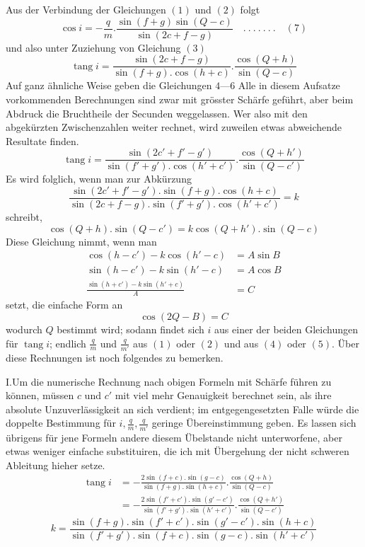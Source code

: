 Aus der Verbindung der Gleichungen $(1)$ und $(2)$ folgt
\[
\cos i=-\frac{q}{m}.\frac{\sin(f+g)\sin(Q-c)}{\sin(2c+f-g)}\quad.\ .\ .\ .\ .\ .\ .\quad(7)
\]
und also unter Zuziehung von Gleichung $(3)$
\[
\operatorname{tang}i=\frac{\sin(2c+f-g)}{\sin(f+g).\cos(h+c)}.\frac{\cos(Q+h)}{\sin(Q-c)}
\]
Auf ganz ähnliche Weise geben die Gleichungen $4$---$6$
\expandafter\def\csname HistoricalNoteText473\endcsname{Alle in diesem Aufsatze vorkommenden Berechnungen sind zwar mit grösster Schärfe geführt, aber beim Abdruck die Bruchtheile der Secunden weggelassen. Wer also mit den abgekürzten Zwischenzahlen weiter rechnet, wird zuweilen etwas abweichende Resultate finden.}
\[
\operatorname{tang}i=\frac{\sin(2c'+f'-g')}{\sin(f'+g').\cos(h'+c')}.\frac{\cos(Q+h')}{\sin(Q-c')}
\]
Es wird folglich, wenn man zur Abkürzung
\[
\frac{\sin(2c'+f'-g').\sin(f+g).\cos(h+c)}{\sin(2c+f-g).\sin(f'+g').\cos(h'+c')}=k
\]
schreibt,
\[
\cos(Q+h).\sin(Q-c')=k\cos(Q+h').\sin(Q-c)
\]
Diese Gleichung nimmt, wenn man
\[
\begin{aligned}
\cos(h-c')-k\cos(h'-c)&=A\sin B\\
\sin(h-c')-k\sin(h'-c)&=A\cos B\\
\frac{\sin(h+c')-k\sin(h'+c)}{A}&=C
\end{aligned}
\]
setzt, die einfache Form an
\[
\cos(2Q-B)=C
\]
wodurch $Q$ bestimmt wird; sodann findet sich $i$ aus einer der beiden Gleichungen für $\operatorname{tang}i$; endlich $\frac{q}{m}$ und $\frac{q}{m'}$ aus $(1)$ oder $(2)$ und aus $(4)$ oder $(5)$. Über diese Rechnungen ist noch folgendes zu bemerken.

I.\quad Um die numerische Rechnung nach obigen Formeln mit Schärfe führen zu können, müssen $c$ und $c'$ mit viel mehr Genauigkeit berechnet sein, als ihre absolute Unzuverlässigkeit an sich verdient; im entgegengesetzten Falle würde die doppelte Bestimmung für $i,\frac{q}{m},\frac{q}{m'}$ geringe Übereinstimmung geben. Es lassen sich übrigens für jene Formeln andere diesem Übelstande nicht unterworfene, aber etwas weniger einfache substituiren, die ich mit Übergehung der nicht schweren Ableitung hieher setze.
\[
\begin{aligned}
\operatorname{tang}i&=-\frac{2\sin(f+c).\sin(g-c)}{\sin(f+g).\sin(h+c)}.\frac{\cos(Q+h)}{\sin(Q-c)}\\
&=-\frac{2\sin(f'+c').\sin(g'-c')}{\sin(f'+g').\sin(h'+c')}.\frac{\cos(Q+h')}{\sin(Q-c')}
\end{aligned}
\]
\[
k=\frac{\sin(f+g).\sin(f'+c').\sin(g'-c').\sin(h+c)}{\sin(f'+g').\sin(f+c).\sin(g-c).\sin(h'+c')}
\]

